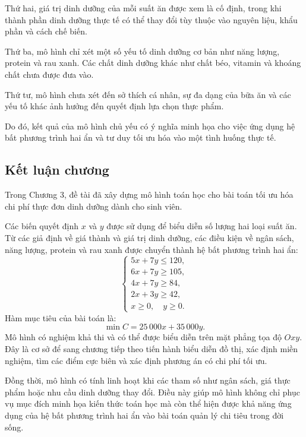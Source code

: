 \documentclass[12pt,a4paper]{article}
\begin{document}
Thứ hai, giá trị dinh dưỡng của mỗi suất ăn được xem là cố định, trong khi thành phần dinh dưỡng thực tế có thể thay đổi tùy thuộc vào nguyên liệu, khẩu phần và cách chế biến.

Thứ ba, mô hình chỉ xét một số yếu tố dinh dưỡng cơ bản như năng lượng, protein và rau xanh. Các chất dinh dưỡng khác như chất béo, vitamin và khoáng chất chưa được đưa vào.

Thứ tư, mô hình chưa xét đến sở thích cá nhân, sự đa dạng của bữa ăn và các yếu tố khác ảnh hưởng đến quyết định lựa chọn thực phẩm.

Do đó, kết quả của mô hình chủ yếu có ý nghĩa minh họa cho việc ứng dụng hệ bất phương trình hai ẩn và tư duy tối ưu hóa vào một tình huống thực tế.

\subsection{Kết luận chương}

Trong Chương 3, đề tài đã xây dựng mô hình toán học cho bài toán tối ưu hóa chi phí thực đơn dinh dưỡng dành cho sinh viên.

Các biến quyết định $x$ và $y$ được sử dụng để biểu diễn số lượng hai loại suất ăn. Từ các giả định về giá thành và giá trị dinh dưỡng, các điều kiện về ngân sách, năng lượng, protein và rau xanh được chuyển thành hệ bất phương trình hai ẩn:
\[
\left\{
\begin{array}{l}
5x+7y\leq120,\\
6x+7y\geq105,\\
4x+7y\geq84,\\
2x+3y\geq42,\\
x\geq0,\quad y\geq0.
\end{array}
\right.
\]
Hàm mục tiêu của bài toán là:
\[
\boxed{
\min C=25\,000x+35\,000y.
}
\]
Mô hình có nghiệm khả thi và có thể được biểu diễn trên mặt phẳng tọa độ $Oxy$. Đây là cơ sở để sang chương tiếp theo tiến hành biểu diễn đồ thị, xác định miền nghiệm, tìm các điểm cực biên và xác định phương án có chi phí tối ưu.

Đồng thời, mô hình có tính linh hoạt khi các tham số như ngân sách, giá thực phẩm hoặc nhu cầu dinh dưỡng thay đổi. Điều này giúp mô hình không chỉ phục vụ mục đích minh họa kiến thức toán học mà còn thể hiện được khả năng ứng dụng của hệ bất phương trình hai ẩn vào bài toán quản lý chi tiêu trong đời sống.

\end{document}
